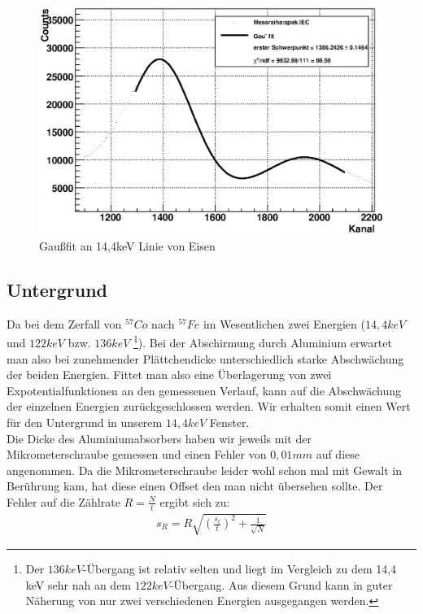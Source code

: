 \documentclass[12pt]{article}
\begin{document}
\begin{figure}[H]
 \includegraphics[width=0.9\linewidth]{pictures/eichung_spek.eps}
 \caption{Gaußfit an 14,4keV Linie von Eisen}
\label{spek}
\end{figure}

\subsection{Untergrund}
Da bei dem Zerfall von $^{57}Co$ nach $^{57}Fe$ im Wesentlichen zwei Energien ($14,4 keV$ und $122 keV$ bzw. $136 keV$
\footnote{Der $136 keV$-Übergang ist relativ selten und liegt im Vergleich zu dem 14,4 keV sehr nah an dem $122 keV$-Übergang. Aus diesem Grund kann in guter
Näherung von nur zwei verschiedenen Energien ausgegangen werden.}). Bei der Abschirmung durch Aluminium erwartet man also bei zunehmender Plättchendicke
unterschiedlich starke Abschwächung der beiden Energien. Fittet man also eine Überlagerung von zwei Expotentialfunktionen an den gemessenen Verlauf, kann auf
die Abschwächung der einzelnen Energien zurückgeschlossen werden. Wir erhalten somit einen Wert für den Untergrund in unserem $14,4 keV$ Fenster.\\

Die Dicke des Aluminiumabsorbers haben wir jeweils mit der Mikrometerschraube gemessen und einen Fehler von $0,01 mm$ auf diese angenommen. Da die Mikrometerschraube leider wohl schon mal mit Gewalt in Berührung kam, hat diese einen Offset den man nicht übersehen sollte.
Der Fehler auf die Zählrate $R = \frac{N}{t}$ ergibt sich zu:
\begin{align}
 s_R = R \sqrt{\left(\frac{s_t}{t}\right)^2 + \frac{1}{\sqrt{N}}}
\end{align}
\end{document}
